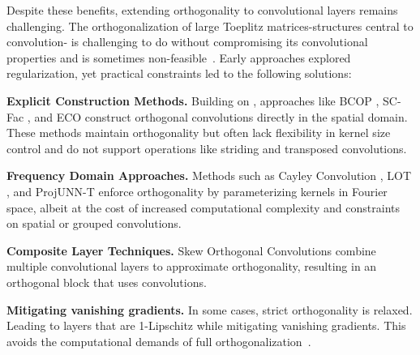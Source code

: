 Despite these benefits, extending orthogonality to convolutional layers remains challenging. The orthogonalization of large Toeplitz matrices-structures central to convolution- is challenging to do without compromising its convolutional properties and is sometimes non-feasible~\cite {achour2023existencestabilityscalabilityorthogonal}. %
Early approaches \cite{wang_orthogonal_2020, qi_deep_isometric_2020} explored regularization, yet practical constraints led to the following solutions:

\noindent \textbf{Explicit Construction Methods.} Building on \cite{xiao_dynamical_2018}, approaches like BCOP \cite{li_preventing_2019}, SC-Fac \cite{su_scaling-up_2021}, and ECO \cite{yu_constructing_2021} construct orthogonal convolutions directly in the spatial domain. These methods maintain orthogonality but often lack flexibility in kernel size control and do not support operations like striding and transposed convolutions.

\noindent \textbf{Frequency Domain Approaches.} Methods such as Cayley Convolution \cite{trockman_orthogonalizing_2021}, LOT \cite{xu_lot_2023}, and ProjUNN-T \cite{kiani_projunn_2022} enforce orthogonality by parameterizing kernels in Fourier space,
albeit at the cost of increased computational complexity and constraints on spatial or grouped convolutions.

\noindent \textbf{Composite Layer Techniques.} Skew Orthogonal Convolutions \cite{singla_skew_2021} combine multiple convolutional layers to approximate orthogonality, resulting in an orthogonal block that uses convolutions. 


\noindent \textbf{Mitigating vanishing gradients.} In some cases, strict orthogonality is relaxed. Leading to layers that are 1-Lipschitz while mitigating vanishing gradients. This avoids the computational demands of full orthogonalization~\cite{prach_almost-orthogonal_2022, meunier_dynamical_2022, araujo_unified_2023}.

